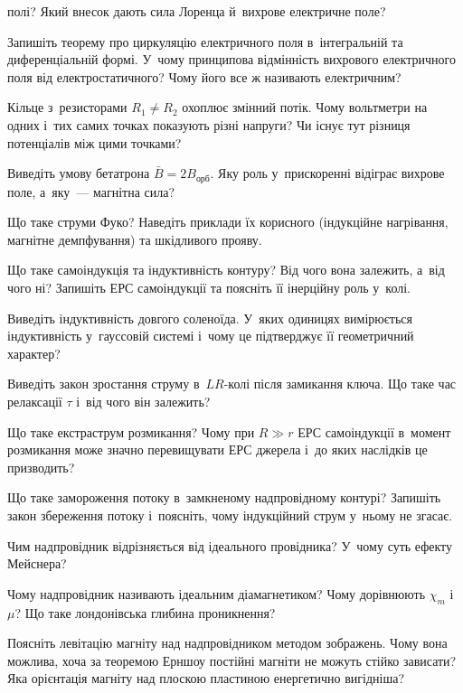 \begin{Questions}
\begin{quizlist}
		полі? Який внесок дають сила Лоренца й~вихрове електричне поле?
		\item Запишіть теорему про циркуляцію електричного поля в~інтегральній та
		диференціальній формі. У~чому принципова відмінність вихрового електричного поля від
		електростатичного? Чому його все ж називають електричним?
		\item Кільце з~резисторами $R_1\neq R_2$ охоплює змінний потік. Чому вольтметри на одних і~тих самих точках показують різні напруги? Чи існує тут
		різниця потенціалів між цими точками?
		\item Виведіть умову бетатрона $\bar B=2B_\text{орб}$. Яку роль у~прискоренні відіграє вихрове поле, а~яку~--- магнітна сила?
		\item Що таке струми Фуко? Наведіть приклади їх корисного (індукційне нагрівання,
		магнітне демпфування) та шкідливого прояву.
		\item Що таке самоіндукція та індуктивність контуру? Від чого вона залежить, а~від
		чого ні? Запишіть ЕРС самоіндукції та поясніть її інерційну роль у~колі.
		\item Виведіть індуктивність довгого соленоїда. У~яких одиницях вимірюється
		індуктивність у~гауссовій системі і~чому це підтверджує її геометричний характер?
		\item Виведіть закон зростання струму в~$LR$-колі після замикання ключа. Що таке час
		релаксації $\tau$ і~від чого він залежить?
		\item Що таке екстраструм розмикання? Чому при $R\gg r$ ЕРС самоіндукції в~момент
		розмикання може значно перевищувати ЕРС джерела і~до яких наслідків це призводить?
		\item Що таке замороження потоку в~замкненому надпровідному контурі? Запишіть закон
		збереження потоку і~поясніть, чому індукційний струм у~ньому не згасає.
		\item Чим надпровідник відрізняється від ідеального провідника? У~чому суть ефекту
		Мейснера?
		\item Чому надпровідник називають ідеальним діамагнетиком? Чому дорівнюють $\chi_m$ і
		$\mu$? Що таке лондонівська глибина проникнення?
		\item Поясніть левітацію магніту над надпровідником методом зображень. Чому вона
		можлива, хоча за теоремою Ерншоу постійні магніти не можуть стійко зависати? Яка
		орієнтація магніту над плоскою пластиною енергетично вигідніша?
	\end{quizlist}
\end{Questions}

